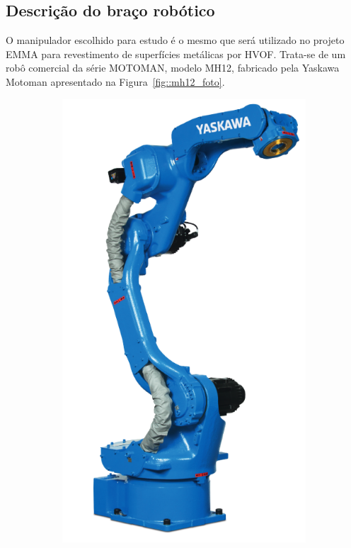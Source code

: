 \subsection{Descrição do braço robótico} \label{sec::descricao_mh12}

O manipulador escolhido para estudo é o mesmo que será utilizado no projeto EMMA
para revestimento de superfícies metálicas por HVOF. Trata-se de um robô
comercial da série MOTOMAN, modelo MH12, fabricado pela Yaskawa Motoman
apresentado na Figura~\ref{fig::mh12_foto}.

\begin{figure}[h]
    \centering
    \begin{subfigure}[b]{0.3\textwidth}
        \includegraphics[width=\textwidth]{figs/mh12_foto}

\end{subfigure}
\end{figure}
